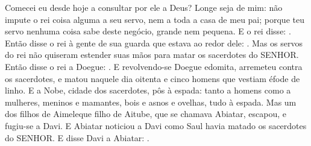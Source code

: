 {{  Comecei eu desde hoje a consultar por ele a Deus? Longe seja de mim: não impute o rei coisa alguma a seu servo, nem a toda a casa de meu pai; porque teu servo nenhuma coisa sabe deste negócio, grande nem pequena}.
  E o rei disse: .
  Então disse o rei à gente de sua guarda que estava ao redor dele: . Mas os servos do rei não quiseram estender suas mãos para matar os sacerdotes do SENHOR.
  Então disse o rei a Doegue: . E revolvendo-se Doegue edomita, arremeteu contra os sacerdotes, e matou naquele dia oitenta e cinco homens que vestiam éfode de linho.
  E a Nobe, cidade dos sacerdotes, pôs à espada: tanto a homens como a mulheres, meninos e mamantes, bois e asnos e ovelhas, tudo à espada.
  Mas um dos filhos de Aimeleque filho de Aitube, que se chamava Abiatar, escapou, e fugiu-se a Davi.
  E Abiatar noticiou a Davi como Saul havia matado os sacerdotes do SENHOR.
  E disse Davi a Abiatar: .
\par }

